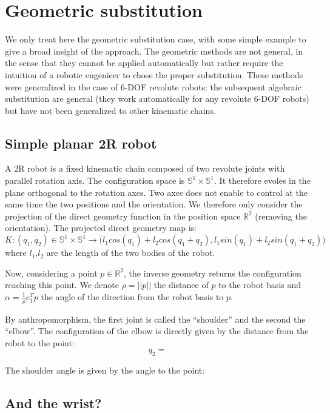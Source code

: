\documentclass{book}
\begin{document}
\section{Geometric substitution}

We only treat here the geometric substitution case, with some simple example to give a broad insight of the approach. The geometric methods are not general, in the sense that they cannot be applied automatically but rather require the intuition of a robotic engenieer to chose the proper substitution. These methods were generalized in the case of 6-DOF revolute robots: the subsequent algebraic substitution are general (they work automatically for any revolute 6-DOF robots) but have not been generalized to other kinematic chains. 

\subsection{Simple planar 2R robot}

A 2R robot is a fixed kinematic chain composed of two revolute joints with parallel rotation axis. The configuration space is $\mathbb{S}^1  \times \mathbb{S}^1$. It therefore evoles in the plane orthogonal to the rotation axes. Two axes does not enable to control at the same time the two positions and the orientation. We therefore only consider the projection of the direct geometry function in the position space $\mathbb{R}^2$ (removing the orientation). The projected direct geometry map is:
\[ K: (q_1,q_2) \in \mathbb{S}^1  \times \mathbb{S}^1 \rightarrow \Big( l_1 cos(q_1)+ l_2 cos(q_1+q_2),l_1 sin(q_1)+ l_2 sin(q_1+q_2) \Big) \]
where $l_1$,$l_2$ are the length of the two bodies of the robot.

Now, considering a point $p \in \mathbb{R}^2$, the inverse geometry returns the configuration reaching this point. We denote $\rho = || p ||$ the distance of $p$ to the robot basis and $\alpha = \frac{1}{\rho} e_1^T p$ the angle of the direction from the robot basis to $p$.

By anthropomorphism, the first joint is called the ``shoulder'' and the second the ``elbow''. The configuration of the elbow is directly given by the distance from the robot to the point:
\[ q_2 = \]

The shoulder angle is given by the angle to the point:
\[ \]

\subsection{And the wrist?}
\end{document}
